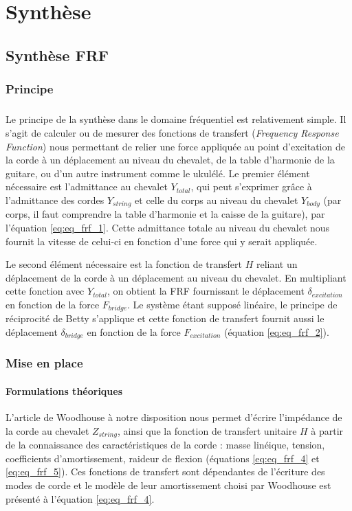 \chapter{Synthèse}
\section{Synthèse FRF}

\subsection{Principe}
\paragraph*{} 

Le principe de la synthèse dans le domaine fréquentiel est relativement simple.
Il s'agit de calculer ou de mesurer des fonctions de transfert
(\textit{Frequency Response Function}) nous permettant de relier une force
appliquée au point d'excitation de la corde à un déplacement au niveau du
chevalet, de la table d'harmonie de la guitare, ou d'un autre instrument comme le ukulélé. Le premier élément nécessaire est l'admittance au chevalet $Y_{total}$, qui peut s'exprimer grâce à l'admittance des cordes $Y_{string}$ et celle du corps au niveau du chevalet $Y_{body}$ (par corps, il faut comprendre la table d'harmonie et la caisse de la guitare), par l'équation \ref{eq:eq_frf_1}. Cette admittance totale au niveau du chevalet nous fournit la vitesse de
celui-ci en fonction d'une force qui y serait appliquée.

Le second élément nécessaire est la fonction de transfert $H$ reliant un
déplacement de la corde à un déplacement au niveau du chevalet. En multipliant cette fonction avec $Y_{total}$, on obtient la FRF fournissant le déplacement $\delta_{excitation}$ en fonction de la force $F_{bridge}$. Le système étant supposé linéaire, le principe de réciprocité de Betty s'applique et cette fonction de transfert fournit aussi le déplacement $\delta_{bridge}$ en fonction de la force $F_{excitation}$ (équation \ref{eq:eq_frf_2}).


\subsection{Mise en place}
\subsubsection{Formulations théoriques}
L'article de Woodhouse à notre disposition nous permet d'écrire l'impédance
de la corde au chevalet $Z_{string}$, ainsi que la fonction de transfert
unitaire $H$ à partir de la connaissance des caractéristiques de la corde :
masse linéique, tension, coefficients d'amortissement, raideur de flexion (équations \ref{eq:eq_frf_4} et \ref{eq:eq_frf_5}). Ces fonctions de transfert sont dépendantes de l'écriture des modes de corde et le modèle de leur amortissement choisi par Woodhouse est présenté à l'équation \ref{eq:eq_frf_4}.

